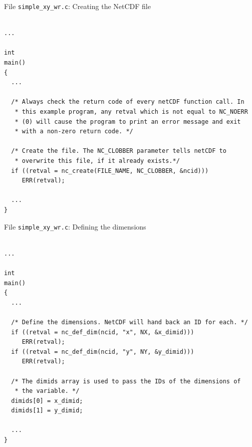 \documentclass[compress,11pt,xcolor=svgnames,aspectratio=169]{beamer}
\begin{document}
\begin{frame}[fragile]{File \texttt{simple\_xy\_wr.c}: Creating the NetCDF file}

\tiny{

\begin{verbatim}

...

int
main()
{
  ...

  /* Always check the return code of every netCDF function call. In
   * this example program, any retval which is not equal to NC_NOERR
   * (0) will cause the program to print an error message and exit
   * with a non-zero return code. */

  /* Create the file. The NC_CLOBBER parameter tells netCDF to
   * overwrite this file, if it already exists.*/
  if ((retval = nc_create(FILE_NAME, NC_CLOBBER, &ncid)))
     ERR(retval);

  ...
}

\end{verbatim}

}

\end{frame}

\begin{frame}[fragile]{File \texttt{simple\_xy\_wr.c}: Defining the dimensions}

\tiny{

\begin{verbatim}

...

int
main()
{
  ...

  /* Define the dimensions. NetCDF will hand back an ID for each. */
  if ((retval = nc_def_dim(ncid, "x", NX, &x_dimid)))
     ERR(retval);
  if ((retval = nc_def_dim(ncid, "y", NY, &y_dimid)))
     ERR(retval);

  /* The dimids array is used to pass the IDs of the dimensions of
   * the variable. */
  dimids[0] = x_dimid;
  dimids[1] = y_dimid;

  ...
}

\end{verbatim}

}

\end{frame}
\end{document}
